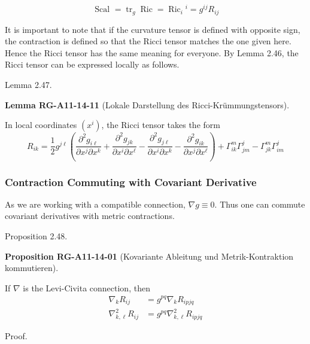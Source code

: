 \documentclass[10pt, letterpaper]{article}
\newcommand{\CustomHeading}[3]{%
  \par\medskip\noindent%
  \textbf{#1 #2} \textnormal{(#3)}.\enskip%
}
\newenvironment{PROP}[2]{\begin{unitbox}\CustomHeading{Proposition}{#1}{#2}}{\end{unitbox}}
\newenvironment{LEM}[2]{\begin{unitbox}\CustomHeading{Lemma}{#1}{#2}}{\end{unitbox}}
\begin{document}
$$
\text { Scal }=\operatorname{tr}_{g} \operatorname{Ric}=\operatorname{Ric}_{i}{ }^{i}=g^{i j} R_{i j}
$$



It is important to note that if the curvature tensor is defined with opposite sign, the contraction is defined so that the Ricci tensor matches the one given here. Hence the Ricci tensor has the same meaning for everyone. By Lemma 2.46, the Ricci tensor can be expressed locally as follows.



Lemma 2.47. 


\begin{LEM}{RG-A11-14-11}{Lokale Darstellung des Ricci-Krümmungstensors}
In local coordinates $\left(x^{i}\right)$, the Ricci tensor takes the form
$$R_{i k}=\frac{1}{2} g^{j \ell}\left(\frac{\partial^{2} g_{i \ell}}{\partial x^{j} \partial x^{k}}+\frac{\partial^{2} g_{j k}}{\partial x^{i} \partial x^{\ell}}-\frac{\partial^{2} g_{j \ell}}{\partial x^{i} \partial x^{k}}-\frac{\partial^{2} g_{i k}}{\partial x^{j} \partial x^{\ell}}\right)+\Gamma_{i k}^{m} \Gamma_{j m}^{j}-\Gamma_{j k}^{m} \Gamma_{i m}^{j}$$
\end{LEM}

\subsubsection*{Contraction Commuting with Covariant Derivative}



As we are working with a compatible connection, $\nabla g \equiv 0$. Thus one can commute covariant derivatives with metric contractions.

Proposition 2.48. 

\begin{PROP}{RG-A11-14-01}{Kovariante Ableitung und Metrik-Kontraktion kommutieren}
If $\nabla$ is the Levi-Civita connection, then
$$
\begin{aligned}
\nabla_{k} R_{i j} & =g^{p q} \nabla_{k} R_{i p j q} \\
\nabla_{k, \ell}^{2} R_{i j} & =g^{p q} \nabla_{k, \ell}^{2} R_{i p j q}
\end{aligned}
$$
\end{PROP}

Proof. 
\end{document}
